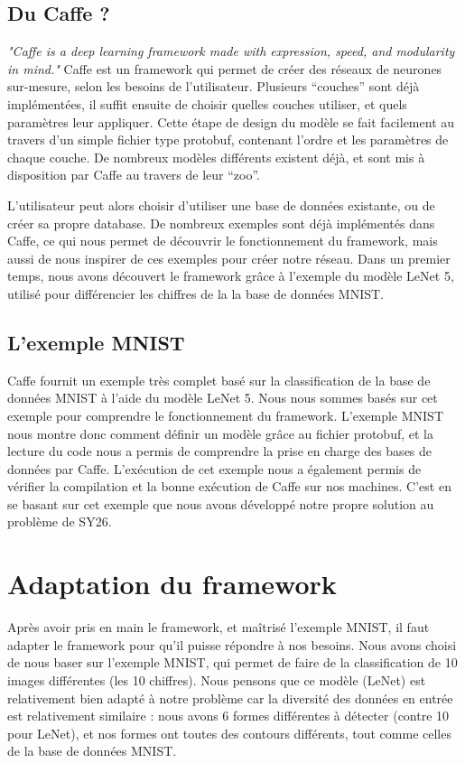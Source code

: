 \documentclass[a4paper,12pt]{article}
\begin{document}
  \subsection{Du Caffe ?}
    \textit{"Caffe is a deep learning framework made with expression, speed, and modularity in mind."}
    Caffe est un framework qui permet de créer des réseaux de neurones sur-mesure, selon les besoins de l'utilisateur. Plusieurs ``couches'' sont déjà implémentées, il suffit ensuite de choisir quelles couches utiliser, et quels paramètres leur appliquer. Cette étape de design du modèle se fait facilement au travers d'un simple fichier type protobuf, contenant l'ordre et les paramètres de chaque couche. De nombreux modèles différents existent déjà, et sont mis à disposition par Caffe au travers de leur ``zoo''.

    L'utilisateur peut alors choisir d'utiliser une base de données existante, ou de créer sa propre database. De nombreux exemples sont déjà implémentés dans Caffe, ce qui nous permet de découvrir le fonctionnement du framework, mais aussi de nous inspirer de ces exemples pour créer notre réseau. Dans un premier temps, nous avons découvert le framework grâce à l'exemple du modèle LeNet 5, utilisé pour différencier les chiffres de la la base de données MNIST.
  
  \subsection{L'exemple MNIST}
    Caffe fournit un exemple très complet basé sur la classification de la base de données MNIST à l'aide du modèle LeNet 5. Nous nous sommes basés sur cet exemple pour comprendre le fonctionnement du framework. L'exemple MNIST nous montre donc comment définir un modèle grâce au fichier protobuf, et la lecture du code nous a permis de comprendre la prise en charge des bases de données par Caffe.
    L'exécution de cet exemple nous a également permis de vérifier la compilation et la bonne exécution de Caffe sur nos machines. C'est en se basant sur cet exemple que nous avons développé notre propre solution au problème de SY26.

\newpage
\section{Adaptation du framework}
  Après avoir pris en main le framework, et maîtrisé l'exemple MNIST, il faut adapter le framework pour qu'il puisse répondre à nos besoins. Nous avons choisi de nous baser sur l'exemple MNIST, qui permet de faire de la classification de 10 images différentes (les 10 chiffres). Nous pensons que ce modèle (LeNet) est relativement bien adapté à notre problème car la diversité des données en entrée est relativement similaire : nous avons 6 formes différentes à détecter (contre 10 pour LeNet), et nos formes ont toutes des contours différents, tout comme celles de la base de données MNIST. 
\end{document}
